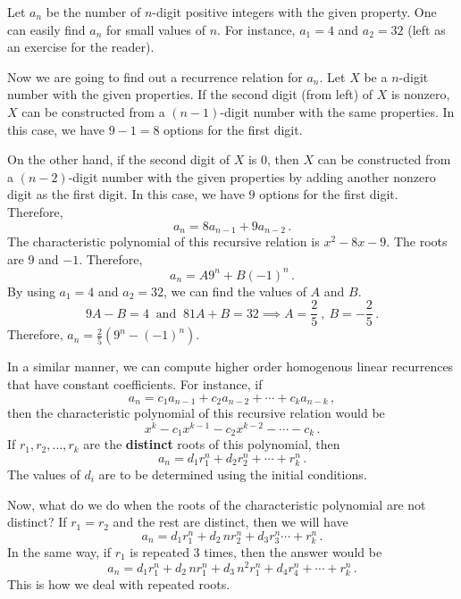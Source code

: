 \documentclass[11pt]{scrartcl}
\begin{document}
\begin{soln}
Let \(a_n\) be the number of \(n\)-digit positive integers with the given property. One can easily find \(a_n\) for small values of \(n\). For instance, \(a_1=4\) and \(a_2 = 32\) (left as an exercise for the reader).

Now we are going to find out a recurrence relation for \(a_n\). Let \(X\) be a \(n\)-digit number with the given properties. If the second digit (from left) of \(X\) is nonzero, \(X\) can be constructed from a \(\left(n-1\right) \)-digit number with the same properties. In this case, we have \(9-1=8\) options for the first digit.

On the other hand, if the second digit of \(X\) is \(0\), then \(X\) can be constructed from a \(\left(n-2\right) \)-digit number with the given properties by adding another nonzero digit as the first digit. In this case, we have \(9\) options for the first digit. Therefore,
\[ a_n = 8a_{n-1} + 9 a_{n-2} \, . \]
The characteristic polynomial of this recursive relation is \(x^2 -8x-9\). The roots are \(9\) and \(-1\). Therefore,
\[ a_n = A 9^n + B \left(-1\right) ^n \, . \]
By using \(a_1 = 4\) and \(a_2 = 32\), we can find the values of \(A\) and \(B\).
\[ 9A-B = 4 \ \text{ and } \ 81A + B = 32 \implies A = \frac{2}{5} \ , \ B = - \frac{2}{5} \, . \]
Therefore, \(a_n = \frac{2}{5} \left(9^n - \left(-1\right) ^n\right) \).
\end{soln}
In a similar manner, we can compute higher order homogenous linear recurrences that have constant coefficients. For instance, if
\[ a_n = c_1a_{n-1} + c_2 a_{n-2} + \cdots + c_k a_{n-k} \, , \]
then the characteristic polynomial of this recursive relation would be
\[ x^k - c_1 x^{k-1} - c_2 x^{k-2} - \cdots - c_k \, . \]
If \(r_1, r_2, \ldots, r_k\) are the \textbf{distinct} roots of this polynomial, then
\[ a_n = d_1 r_1 ^n + d_2 r_2^n + \cdots + r_k ^n \, . \]
The values of \(d_i\) are to be determined using the initial conditions.

\vspace{3mm}

Now, what do we do when the roots of the characteristic polynomial are not distinct? If \(r_1 = r_2\) and the rest are distinct, then we will have
\[ a_n = d_1 r_1 ^n + d_2\, n r_2^n + d_3 r_3^n \cdots + r_k ^n \, . \]
In the same way, if \(r_1\) is repeated \(3\) times, then the answer would be
\[ a_n = d_1 r_1 ^n + d_2\, nr_1 ^n + d_3 \, n^2 r_1^n+ d_4r_4^n+ \cdots + r_k ^n \, . \]
This is how we deal with repeated roots.
\end{document}
